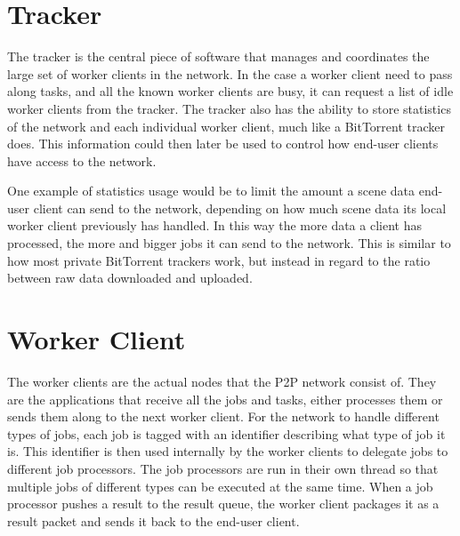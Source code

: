 \section{Tracker}
The tracker is the central piece of software that manages and coordinates the large set of worker clients in the network.
In the case a worker client need to pass along tasks, and all the known worker clients are busy, it can request a list of idle worker clients from the tracker. The tracker also has the ability to store statistics of the network and each individual worker client, much like a BitTorrent tracker does. This information could then later be used to control how end-user clients have access to the network. 

One example of statistics usage would be to limit the amount a scene data end-user client can send to the network, depending on how much scene data its local worker client previously has handled. In this way the more data a client has processed, the more and bigger jobs it can send to the network. This is similar to how most private BitTorrent trackers work, but instead in regard to the ratio between raw data downloaded and uploaded.



\section{Worker Client}
The worker clients are the actual nodes that the P2P network consist of. They are the applications that receive all the jobs and tasks, either processes them or sends them along to the next worker client. For the network to handle different types of jobs, each job is tagged with an identifier describing what type of job it is. This identifier is then used internally by the worker clients to delegate jobs to different job processors. The job processors are run in their own thread so that multiple jobs of different types can be executed at the same time. When a job processor pushes a result to the result queue, the worker client packages it as a result packet and sends it back to the end-user client.

